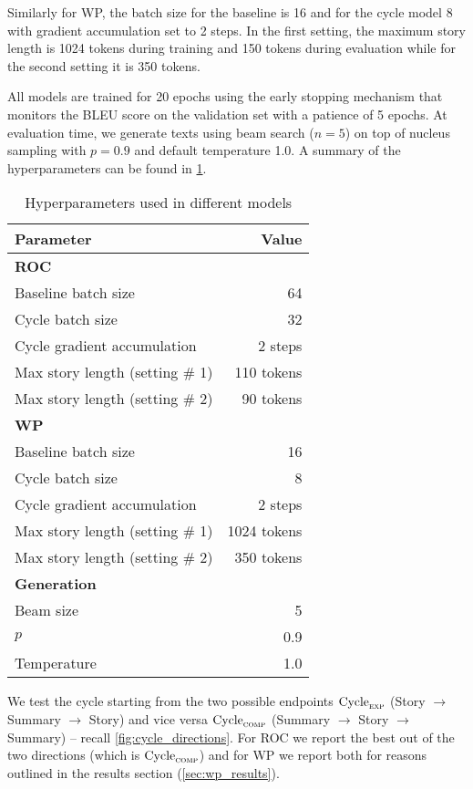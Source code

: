 Similarly for WP, the batch size for the baseline is 16 and for the cycle model 8 with gradient accumulation set to 2 steps. In the first setting, the maximum story length is 1024 tokens during training and 150 tokens during evaluation while for the second setting it is 350 tokens.

All models are trained for 20 epochs using the early stopping mechanism that monitors the BLEU score on the validation set with a patience of 5 epochs. At evaluation time, we generate texts using beam search ($n = 5$) on top of nucleus sampling \citep{holtzman2019curious} with $p = 0.9$ and default temperature 1.0. A summary of the hyperparameters can be found in \cref{tab:hyperparameters}.

\begin{table}[ht]
\centering
\begin{tabular}{l|r}
Parameter & Value \\ \hline
\multicolumn{2}{l}{\textbf{ROC}} \\
Baseline batch size & 64 \\
Cycle batch size & 32 \\
Cycle gradient accumulation & 2 steps \\
Max story length (setting \# 1) & 110 tokens \\
Max story length (setting \# 2) & 90 tokens \\ \hline
\multicolumn{2}{l}{\textbf{WP}} \\
Baseline batch size & 16 \\
Cycle batch size & 8 \\
Cycle gradient accumulation & 2 steps \\
Max story length (setting \# 1) & 1024 tokens \\
Max story length (setting \# 2) & 350 tokens \\ \hline
\multicolumn{2}{l}{\textbf{Generation}} \\
Beam size & 5 \\
$p$ & 0.9 \\
Temperature & 1.0 \\ \hline
\end{tabular}
\caption{Hyperparameters used in different models}
\label{tab:hyperparameters}
\end{table}

We test the cycle starting from the two possible endpoints $\text{Cycle}_{\textsc{exp}}$ (Story $\rightarrow$ Summary $\rightarrow$ Story) and vice versa $\text{Cycle}_{\textsc{comp}}$ (Summary $\rightarrow$ Story $\rightarrow$ Summary) -- recall \cref{fig:cycle_directions}. For ROC we report the best out of the two directions (which is $\text{Cycle}_{\textsc{comp}}$) and for WP we report both for reasons outlined in the results section (\cref{sec:wp_results}).

